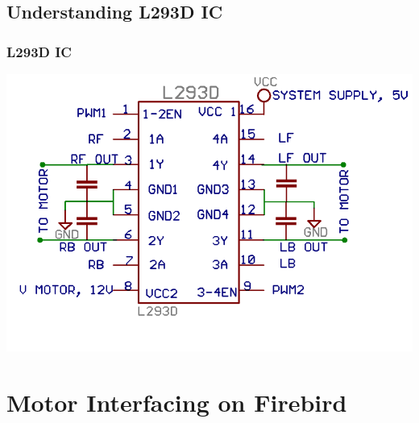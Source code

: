 \documentclass[table,10pt,red]{beamer}
\begin{document}
\subsection{Understanding L293D IC}
	\begin{frame}
		\frametitle{L293D IC}	\pause
			\includegraphics[width=\linewidth]{L293D}
	\end{frame}
	
\section{Motor Interfacing on Firebird}
	
\end{document}
